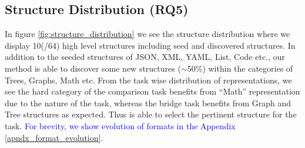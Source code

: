 \subsection{Structure Distribution (RQ5)}
In figure \ref{fig:structure_distribution} we see the structure distribution where we display 10(/64) high level structures including seed and discovered structures. 
In addition to the seeded structures of JSON, XML, YAML, List, Code etc., our method is able to discover some new structures ($\sim 50\%$) within the categories of Trees, Graphs, Math etc. 
From the task wise distribution of representations, we see the hard category of the comparison task benefits from ``Math'' representation due to the nature of the task, whereas the bridge task benefits from Graph and Tree structures as expected. Thus \method is able to select the pertinent structure for the task. 
\textcolor{blue}{For brevity, we show evolution of formats in the \textcolor{blue}{Appendix \ref{apndx_format_evolution}}.}

